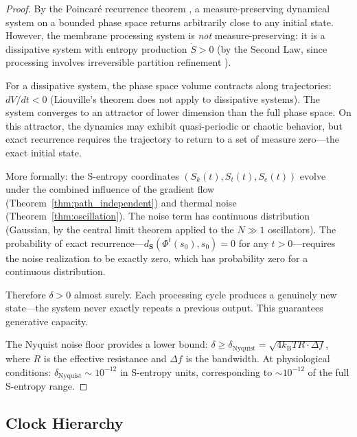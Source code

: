 \documentclass[twocolumn,10pt]{article}
\theoremstyle{remark}
\newcommand{\kB}{k_{\mathrm{B}}}
\newcommand{\Sk}{S_k}
\newcommand{\St}{S_t}
\newcommand{\Se}{S_e}
\newcommand{\Scoord}{\mathbf{S}}
\begin{document}
\begin{proof}
By the Poincar\'e recurrence theorem \cite{poincare1890}, a measure-preserving dynamical system on a bounded phase space returns arbitrarily close to any initial state. However, the membrane processing system is \emph{not} measure-preserving: it is a dissipative system with entropy production $\dot{S} > 0$ (by the Second Law, since processing involves irreversible partition refinement \cite{landauer1961,boltzmann1877}).

For a dissipative system, the phase space volume contracts along trajectories: $dV/dt < 0$ (Liouville's theorem does not apply to dissipative systems). The system converges to an attractor of lower dimension than the full phase space. On this attractor, the dynamics may exhibit quasi-periodic or chaotic behavior, but exact recurrence requires the trajectory to return to a set of measure zero---the exact initial state.

More formally: the S-entropy coordinates $(\Sk(t), \St(t), \Se(t))$ evolve under the combined influence of the gradient flow (Theorem~\ref{thm:path_independent}) and thermal noise (Theorem~\ref{thm:oscillation}). The noise term has continuous distribution (Gaussian, by the central limit theorem applied to the $N \gg 1$ oscillators). The probability of exact recurrence---$d_{\Scoord}(\Phi^t(s_0), s_0) = 0$ for any $t > 0$---requires the noise realization to be exactly zero, which has probability zero for a continuous distribution.

Therefore $\delta > 0$ almost surely. Each processing cycle produces a genuinely new state---the system never exactly repeats a previous output. This guarantees generative capacity.

The Nyquist noise floor \cite{nyquist1928} provides a lower bound: $\delta \geq \delta_{\mathrm{Nyquist}} = \sqrt{4\kB T R \cdot \Delta f}$, where $R$ is the effective resistance and $\Delta f$ is the bandwidth. At physiological conditions: $\delta_{\mathrm{Nyquist}} \sim 10^{-12}$ in S-entropy units, corresponding to $\sim 10^{-12}$ of the full S-entropy range.
\end{proof}

\subsection{Clock Hierarchy}
\end{document}
